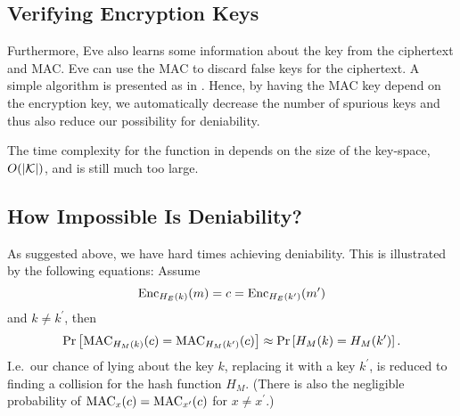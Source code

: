 \subsection{Verifying Encryption Keys}

Furthermore, Eve also learns some information about the key from the ciphertext 
and \ac{MAC}.
Eve can use the \ac{MAC} to discard false keys for the ciphertext.
A simple algorithm is presented as  in 
.
Hence, by having the \ac{MAC} key depend on the encryption key, we 
automatically decrease the number of spurious keys and thus also reduce our 
possibility for deniability.

\begin{algorithm}
  \caption{%
    Algorithm for finding possible plaintexts and discarding false keys.
  }\label{alg:falsekeys}
  \begin{algorithmic}
      \EndIf{}
    \EndFunction{}

    \Statex{}
        \EndIf{}
      \EndFor{}
    \EndFunction{}
  \end{algorithmic}
\end{algorithm}

The time complexity for the function  in  
depends on the size of the key-space, \(O(|\mathcal K|)\), and is still much too 
large.

\subsection{How Impossible Is Deniability?}

As suggested above, we have hard times achieving deniability.
This is illustrated by the following equations:
Assume
\begin{equation*}
  \operatorname{\mathrm{Enc}}_{H_E(k)}( m ) = c = \operatorname{\mathrm{Enc}}_{H_E(k^\prime)}( m^\prime )
\end{equation*}
and \(k\neq k^\prime\), then
\begin{equation*}
  \Pr\left[
    \operatorname{\mathrm{MAC}}_{H_M(k)}( c ) = \operatorname{\mathrm{MAC}}_{H_M(k^\prime)}( c )
  \right]
  \approx
  \Pr\left[ H_M(k) = H_M(k^\prime) \right].
\end{equation*}
I.e.~our chance of lying about the key \(k\), replacing it with a key 
\(k^\prime\), is reduced to finding a collision for the hash function \(H_M\).
(There is also the negligible probability of \(\operatorname{\mathrm{MAC}}_x(c) = \operatorname{\mathrm{MAC}}_{x^\prime}(c)\) 
for \(x\neq x^\prime\).)

